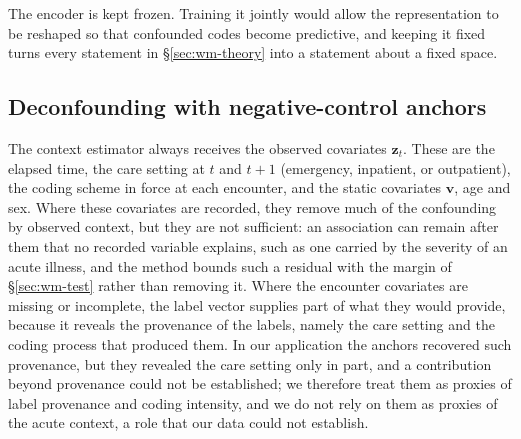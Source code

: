 The encoder is kept frozen. Training it jointly would allow the representation to be reshaped so that confounded codes become predictive, and keeping it fixed turns every statement in \S\ref{sec:wm-theory} into a statement about a fixed space.

\subsection{Deconfounding with negative-control anchors}
\label{sec:wm-deconf}

The context estimator always receives the observed covariates $\mathbf{z}_t$. These are the elapsed time, the care setting at $t$ and $t+1$ (emergency, inpatient, or outpatient), the coding scheme in force at each encounter, and the static covariates $\mathbf{v}$, age and sex. Where these covariates are recorded, they remove much of the confounding by observed context, but they are not sufficient: an association can remain after them that no recorded variable explains, such as one carried by the severity of an acute illness, and the method bounds such a residual with the margin of \S\ref{sec:wm-test} rather than removing it. Where the encounter covariates are missing or incomplete, the label vector supplies part of what they would provide, because it reveals the provenance of the labels, namely the care setting and the coding process that produced them. In our application the anchors recovered such provenance, but they revealed the care setting only in part, and a contribution beyond provenance could not be established; we therefore treat them as proxies of label provenance and coding intensity, and we do not rely on them as proxies of the acute context, a role that our data could not establish.

